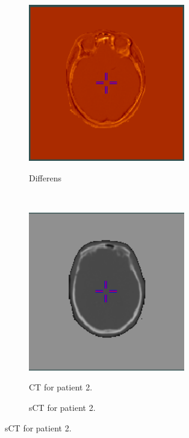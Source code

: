 \begin{figure}
\begin{subfigure}[b]{0.3\textwidth}
        \caption{Differens}
        \includegraphics[width=0.75\textwidth]{colager/loocv_ct/loocv_010476_sub.png}
        \label{col:loocv_ct_pat1_sub}
    \end{subfigure}\\
    \begin{subfigure}[b]{0.3\textwidth}
        \caption{CT for patient 2.}
        \includegraphics[width=0.75\textwidth]{colager/loocv_ct/loocv_010769_ct.png}
        \label{col:loocv_ct_pat2_ct}
    \end{subfigure}\hfill
    \begin{subfigure}[b]{0.3\textwidth}
        \caption{sCT for patient 2.}

\end{subfigure}
\end{figure}
